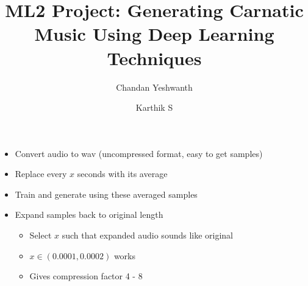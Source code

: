 \documentclass{article}
\begin{document}
\title{ML2 Project: Generating Carnatic Music Using Deep Learning Techniques}
\author{Chandan Yeshwanth \and Karthik S}
\maketitle

\begin{itemize}
\item Convert audio to wav (uncompressed format, easy to get samples)
\item Replace every $x$ seconds with its average
\item Train and generate using these averaged samples
\item Expand samples back to original length
	\begin{itemize}
		\item Select $x$ such that expanded audio sounds like original
		\item $x \in (0.0001, 0.0002)$ works
		\item Gives compression factor 4 - 8
	\end{itemize} 


\end{itemize} 
\end{document}
